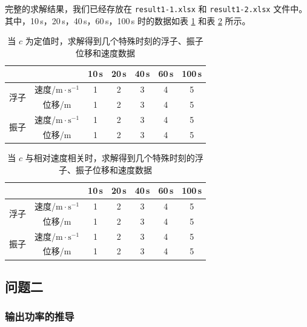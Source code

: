 完整的求解结果，我们已经存放在 \verb|result1-1.xlsx| 和 \verb|result1-2.xlsx| 文件中。其中，10\,s，20\,s，40\,s，60\,s，100\,s 时的数据如表 \ref{answer-1-1} 和表 \ref{answer-1-2} 所示。
\begin{table}[htbp]
    \centering
    \begin{tabular}{ccccccc}
        \toprule
        & & 10\,s & 20\,s & 40\,s & 60\,s & 100\,s \\
        \midrule
        \multirow{2}{*}{浮子} & 速度/$\mathrm{m}\cdot\mathrm{s}^{-1}$ & 1 & 2 & 3 & 4 & 5 \\
        & 位移/$\mathrm{m}$ & 1 & 2 & 3 & 4 & 5 \\
        \multirow{2}{*}{振子} & 速度/$\mathrm{m}\cdot\mathrm{s}^{-1}$ & 1 & 2 & 3 & 4 & 5 \\
        & 位移/$\mathrm{m}$ & 1 & 2 & 3 & 4 & 5 \\
        \bottomrule
    \end{tabular}
    \caption{当 $c$ 为定值时，求解得到几个特殊时刻的浮子、振子位移和速度数据}
    \label{answer-1-1}
\end{table}

\begin{table}[htbp]
    \centering
    \begin{tabular}{ccccccc}
        \toprule
        & & 10\,s & 20\,s & 40\,s & 60\,s & 100\,s \\
        \midrule
        \multirow{2}{*}{浮子} & 速度/$\mathrm{m}\cdot\mathrm{s}^{-1}$ & 1 & 2 & 3 & 4 & 5 \\
        & 位移/$\mathrm{m}$ & 1 & 2 & 3 & 4 & 5 \\
        \multirow{2}{*}{振子} & 速度/$\mathrm{m}\cdot\mathrm{s}^{-1}$ & 1 & 2 & 3 & 4 & 5 \\
        & 位移/$\mathrm{m}$ & 1 & 2 & 3 & 4 & 5 \\
        \bottomrule
    \end{tabular}
    \caption{当 $c$ 与相对速度相关时，求解得到几个特殊时刻的浮子、振子位移和速度数据}
    \label{answer-1-2}
\end{table}



\subsection{问题二}

\subsubsection{输出功率的推导}

